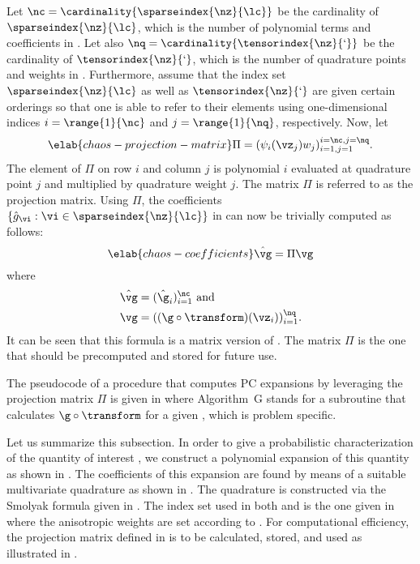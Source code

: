 Let $\nc = \cardinality{\sparseindex{\nz}{\lc}}$ be the cardinality of
$\sparseindex{\nz}{\lc}$, which is the number of polynomial terms and
coefficients in . Let also $\nq =
\cardinality{\tensorindex{\nz}{\lq}}$ be the cardinality of
$\tensorindex{\nz}{\lq}$, which is the number of quadrature points and weights
in . Furthermore, assume that the index set
$\sparseindex{\nz}{\lc}$ as well as $\tensorindex{\nz}{\lq}$ are given certain
orderings so that one is able to refer to their elements using one-dimensional
indices $i = \range{1}{\nc}$ and $j = \range{1}{\nq}$, respectively. Now, let
\begin{equation} \elab{chaos-projection-matrix}
  \Pi = (\psi_i(\vz_j) w_j)_{i = 1, j = 1}^{i = \nc, j = \nq}.
\end{equation}
The element of $\Pi$ on row $i$ and column $j$ is polynomial $i$ evaluated at
quadrature point $j$ and multiplied by quadrature weight $j$. The matrix $\Pi$
is referred to as the projection matrix. Using $\Pi$, the coefficients $\{
\hat{g}_{\vi}: \vi \in \sparseindex{\nz}{\lc} \}$ in  can
now be trivially computed as follows:
\begin{equation} \elab{chaos-coefficients}
  \hat{\vg} = \Pi \vg
\end{equation}
where
\begin{align*}
  & \hat{\vg} = (\hat{\g}_i)_{i = 1}^\nc \text{ and} \\
  & \vg = ((\g \circ \transform)(\vz_i))_{i = 1}^\nq.
\end{align*}
It can be seen that this formula is a matrix version of
. The matrix $\Pi$ is the one that should be precomputed
and stored for future use.

The pseudocode of a procedure that computes \ac{PC} expansions by leveraging the
projection matrix $\Pi$ is given in  where Algorithm~G
stands for a subroutine that calculates $\g \circ \transform$ for a given \vz,
which is problem specific.

Let us summarize this subsection. In order to give a probabilistic
characterization of the quantity of interest \g, we construct a polynomial
expansion of this quantity as shown in . The coefficients
of this expansion are found by means of a suitable multivariate quadrature as
shown in . The quadrature is constructed via the Smolyak
formula given in . The index set used in both
 and  is the one given in
 where the anisotropic weights are set
according to . For computational efficiency, the
projection matrix defined in  is to be calculated,
stored, and used as illustrated in .

